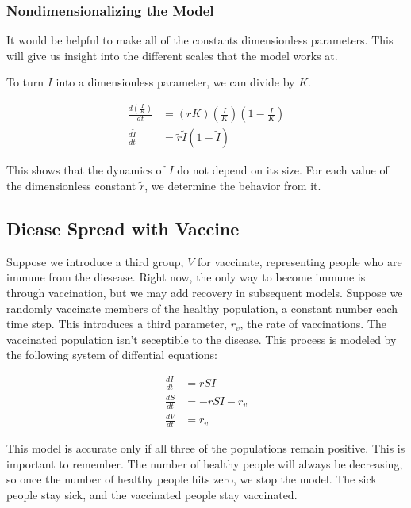 \documentclass{article}
\begin{document}
\subsubsection{Nondimensionalizing the Model}

It would be helpful to make all of the constants dimensionless parameters.
This will give us insight into the different scales that the model works at.

To turn $I$ into a dimensionless parameter, we can divide by $K$.

\begin{align*}
\frac{d\left(\frac{I}{K}\right)}{dt}
	& = \left( r K \right) \left( \frac{I}{K} \right) \left( 1 - \frac{I}{K} \right)\\
\frac{d\widetilde{I}}{dt}
	& = \widetilde{r} \widetilde{I} \left( 1 - \widetilde{I} \right)
\end{align*}

This shows that the dynamics of $I$ do not depend on its size.
For each value of the dimensionless constant $\widetilde{r}$,
	we determine the behavior from it.

\subsection{Diease Spread with Vaccine}

Suppose we introduce a third group, $V$ for vaccinate, representing people who are
	immune from the diesease.
Right now, the only way to become immune is through vaccination,
	but we may add recovery in subsequent models.
Suppose we randomly vaccinate members of the healthy population,
	a constant number each time step.
This introduces a third parameter, $r_v$, the rate of vaccinations.
The vaccinated population isn't seceptible to the disease.
This process is modeled by the following system of diffential equations:

\begin{align*}
\frac{dI}{dt} & = r S I \\
\frac{dS}{dt} & = - r S I - r_v \\
\frac{dV}{dt} & = r_v
\end{align*}

This model is accurate only if all three of the populations remain
	positive.
This is important to remember.
The number of healthy people will always be decreasing, so once
	the number of healthy people hits zero, we stop the model.
The sick people stay sick, and the vaccinated people stay vaccinated.
\end{document}
